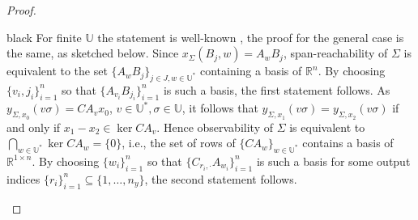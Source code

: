 \documentclass[journal,twoside,web]{ieeecolor}
\newcommand{\SPAN}{\mathrm{Span}}
\newcommand{\Rank}{\mathrm{Rank}}
\begin{document}
\begin{proof}
  \begin{color}{black}
  For finite $\mathbb{U}$ the statement is well-known \cite{MFliessHank, Reut:Book,Son:Real}, the proof for the general case is the same, as sketched below. 
 Since $x_{\Sigma}(B_j,w)=A_wB_j$, 
 span-reachability of $\Sigma$ is equivalent to the set $\{A_wB_j \}_{j \in J, w \in \mathbb{U}^{*}}$ containing a basis 
 of $\mathbb{R}^n$.
 By choosing $\{v_i,j_i\}_{i=1}^{n}$ so that $\{A_{v_i}B_{j_i}\}_{i=1}^{n}$ is such a  basis, 
 the first statement follows. As $y_{\Sigma,x_0}(v\sigma)=CA_vx_0$, 
 $v \in \mathbb{U}^{*}, \sigma \in \mathbb{U}$, 
 it follows that
 $y_{\Sigma,x_1}(v\sigma)=y_{\Sigma,x_2}(v\sigma)$ if and only if $x_1-x_2 \in  \ker CA_v$.
 Hence 
 observability of $\Sigma$ is equivalent to $\bigcap_{w \in \mathbb{U}^{*}} \ker CA_w=\{0\}$, i.e., the set of rows of
 $\{CA_w\}_{w \in \mathbb{U}^{*}}$ 
 contains a basis of $\mathbb{R}^{1 \times n}$. By choosing $\{w_i\}_{i=1}^{n}$ so that $\{C_{r_i,\cdot}A_{w_i}\}_{i=1}^{n}$ is such a basis for some output indices $\{r_i\}_{i=1}^{n} \subseteq \{1,\ldots,n_y\}$,
 the second statement follows. 
  \end{color}
\end{proof}

 
\end{document}
